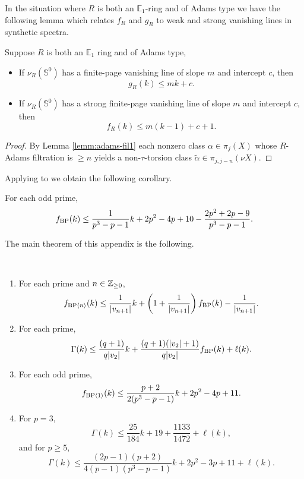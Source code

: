In the situation where $R$ is both an $\mathbb{E}_1$-ring and of Adams type we have the following lemma which relates $f_R$ and $g_R$ to weak and strong vanishing lines in synthetic spectra. 

\begin{lem}
  \label{lemm:strong-vl->f}
  Suppose $R$ is both an $\mathbb{E}_1$ ring and of Adams type,
  \begin{itemize}
      \item If $\nu_{R} (\mathbb{S}^{0})$ has a finite-page vanishing line of slope $m$ and intercept $c$,
    then
    $$ g_R(k) \leq mk + c. $$
\item If $\nu_{R} (\mathbb{S}^{0})$ has a strong finite-page vanishing line of slope $m$ and intercept $c$,
    then
    $$ f_R(k) \leq m(k-1) + c + 1.  $$
  \end{itemize}
\end{lem}

\begin{proof}
  By Lemma \ref{lemm:adams-fil1} each nonzero class $\alpha \in \pi_j(X)$ whose $R$-Adams filtration is $\geq n$ yields a non-$\tau$-torsion class $\tilde{\alpha} \in \pi_{j,j-n}(\nu X)$.
\end{proof}

Applying  to  we obtain the following corollary.

\begin{cor}
  \label{cor:ANvl}
  For each odd prime,
  $$ f_{\mathrm{BP}}(k) \leq \frac{1}{p^3 - p -1}k + 2p^2 - 4p + 10 - \frac{2p^2+2p-9}{p^3 - p -1}. $$
\end{cor}
The main theorem of this appendix is the following.


\begin{thm}\label{thm:app-main}\ 
  \begin{enumerate}
  \item For each prime and $n \in \mathbb{Z}_{\geq 0}$,
    $$ f_{\mathrm{BP}\langle n \rangle}(k) \leq \frac{1}{|v_{n+1}|}k + \left(1 + \frac{1}{|v_{n+1}|} \right) f_{\mathrm{BP}}(k) - \frac{1}{|v_{n+1}|}. $$
  \item For each prime,
    $$ \Gamma(k) \leq \frac{(q+1)}{q|v_2|}k + \frac{(q+1)(|v_2| + 1)}{q|v_2|}f_{\mathrm{BP}}(k) + \ell(k). $$
  \item For each odd prime,
    $$ f_{\mathrm{BP}\langle 1\rangle}(k) \leq \frac{p+2}{2(p^3 - p -1)}k + 2p^2 - 4p + 11. $$
  \item For $p=3$,
    $$ \Gamma(k) \leq \frac{25}{184}k + 19 + \frac{1133}{1472} + \ell(k), $$
    and for $p \geq 5,$
    $$ \Gamma(k) \leq \frac{(2p-1)(p+2)}{4(p-1)(p^3 - p -1)}k + 2p^2 - 3p + 11 + \ell(k). $$
  \end{enumerate}
\end{thm}

